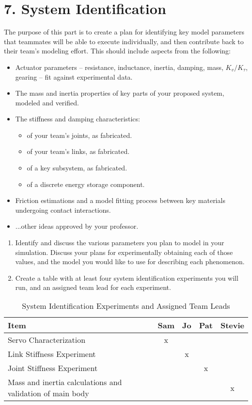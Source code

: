 \documentclass[12pt]{article}
\begin{document}
\section*{7. System Identification}
The purpose of this part is to create a plan for identifying key model parameters that teammates will be able to execute individually, and then contribute back to their team’s modeling effort. This should include aspects from the following:
\begin{itemize}
    \item Actuator parameters – resistance, inductance, inertia, damping, mass, $K_v / K_\tau$, gearing – fit against experimental data.
    \item The mass and inertia properties of key parts of your proposed system, modeled and verified.
    \item The stiffness and damping characteristics:
    \begin{itemize}
        \item of your team’s joints, as fabricated.
        \item of your team’s links, as fabricated.
        \item of a key subsystem, as fabricated.
        \item of a discrete energy storage component.
    \end{itemize}
    \item Friction estimations and a model fitting process between key materials undergoing contact interactions.
    \item ...other ideas approved by your professor.
\end{itemize}

\begin{enumerate}
    \item Identify and discuss the various parameters you plan to model in your simulation. Discuss your plans for experimentally obtaining each of those values, and the model you would like to use for describing each phenomenon.
    
    \item Create a table with at least four system identification experiments you will run, and an assigned team lead for each experiment.
\end{enumerate}

\begin{table}[h]
\centering
\begin{tabular}{|l|c|c|c|c|}
\hline
\textbf{Item} & \textbf{Sam} & \textbf{Jo} & \textbf{Pat} & \textbf{Stevie} \\
\hline
Servo Characterization & x &  &  &  \\
Link Stiffness Experiment &  & x &  &  \\
Joint Stiffness Experiment &  &  & x &  \\
Mass and inertia calculations and validation of main body &  &  &  & x \\
\hline
\end{tabular}
\caption{System Identification Experiments and Assigned Team Leads}
\end{table}
\end{document}
